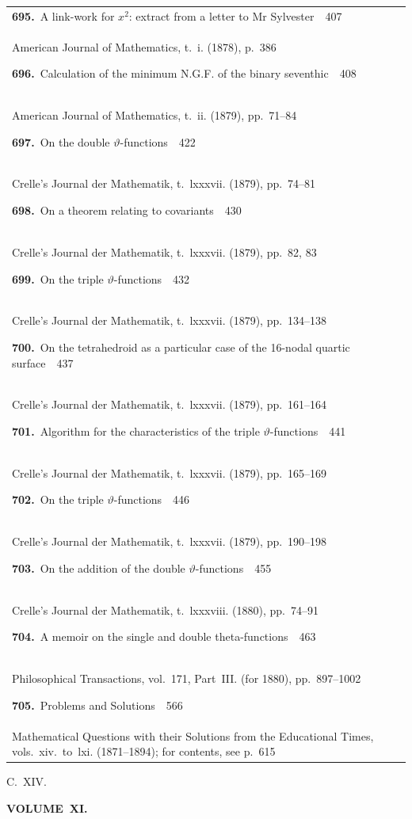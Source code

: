 \documentclass[11pt,a4paper]{book}
\newcommand{\paperentry}[4]{%
  \noindent\textbf{#1.}\ {#2}\ \dotfill\ {#3}\\[-0.2em]%
  {\small #4}\par\vspace{0.6em}%
}
\begin{document}
\begin{center}
\begin{tabular}{p{4.2in}r}
\paperentry{695}{A link-work for $x^{2}$: extract from a letter to Mr Sylvester}{407}{American Journal of Mathematics, t.~i. (1878), p.~386}
\paperentry{696}{Calculation of the minimum N.G.F. of the binary seventhic}{408}{American Journal of Mathematics, t.~ii. (1879), pp.~71--84}
\paperentry{697}{On the double $\vartheta$-functions}{422}{Crelle's Journal der Mathematik, t.~lxxxvii. (1879), pp.~74--81}
\paperentry{698}{On a theorem relating to covariants}{430}{Crelle's Journal der Mathematik, t.~lxxxvii. (1879), pp.~82, 83}
\paperentry{699}{On the triple $\vartheta$-functions}{432}{Crelle's Journal der Mathematik, t.~lxxxvii. (1879), pp.~134--138}
\paperentry{700}{On the tetrahedroid as a particular case of the 16-nodal quartic surface}{437}{Crelle's Journal der Mathematik, t.~lxxxvii. (1879), pp.~161--164}
\paperentry{701}{Algorithm for the characteristics of the triple $\vartheta$-functions}{441}{Crelle's Journal der Mathematik, t.~lxxxvii. (1879), pp.~165--169}
\paperentry{702}{On the triple $\vartheta$-functions}{446}{Crelle's Journal der Mathematik, t.~lxxxvii. (1879), pp.~190--198}
\paperentry{703}{On the addition of the double $\vartheta$-functions}{455}{Crelle's Journal der Mathematik, t.~lxxxviii. (1880), pp.~74--91}
\paperentry{704}{A memoir on the single and double theta-functions}{463}{Philosophical Transactions, vol.~171, Part~III. (for 1880), pp.~897--1002}
\paperentry{705}{Problems and Solutions}{566}{Mathematical Questions with their Solutions from the Educational Times, vols.~xiv.~to~lxi. (1871--1894); for contents, see p.~615}
\end{tabular}
\end{center}

\newpage
\thispagestyle{empty}
\noindent\hfill{\large C.~XIV.}\hfill\null\vspace{0.5em}

\begin{center}
{\Large\bfseries VOLUME~XI.}
\end{center}
\vspace{0.5em}
\end{document}
